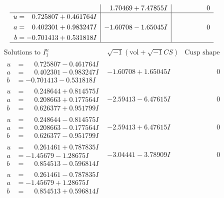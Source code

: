 \documentclass[1p]{elsarticle_modified}
\theoremstyle{definition}
\newcommand{\I}{\sqrt{-1}}
\begin{document}
$$\begin{array}{c|c|c}
 & \phantom{-}1.70469 + 7.47855 I & \phantom{-0.000000 } 0 \\ \hline\begin{aligned}
u &= \phantom{-}0.725807 + 0.461764 I \\
a &= \phantom{-}0.402301 + 0.983247 I \\
b &= -0.701413 + 0.531818 I\end{aligned}
 & -1.60708 - 1.65045 I & \phantom{-0.000000 } 0\\
 \hline 
 \end{array}$$\newpage$$\begin{array}{c|c|c}  
\text{Solutions to }I^u_{1}& \I (\text{vol} + \sqrt{-1}CS) & \text{Cusp shape}\\
 \hline 
\begin{aligned}
u &= \phantom{-}0.725807 - 0.461764 I \\
a &= \phantom{-}0.402301 - 0.983247 I \\
b &= -0.701413 - 0.531818 I\end{aligned}
 & -1.60708 + 1.65045 I & \phantom{-0.000000 } 0 \\ \hline\begin{aligned}
u &= \phantom{-}0.248644 + 0.814575 I \\
a &= \phantom{-}0.208663 + 0.177564 I \\
b &= \phantom{-}0.626377 + 0.951799 I\end{aligned}
 & -2.59413 - 6.47615 I & \phantom{-0.000000 } 0 \\ \hline\begin{aligned}
u &= \phantom{-}0.248644 - 0.814575 I \\
a &= \phantom{-}0.208663 - 0.177564 I \\
b &= \phantom{-}0.626377 - 0.951799 I\end{aligned}
 & -2.59413 + 6.47615 I & \phantom{-0.000000 } 0 \\ \hline\begin{aligned}
u &= \phantom{-}0.261461 + 0.787835 I \\
a &= -1.45679 - 1.28675 I \\
b &= \phantom{-}0.854513 - 0.596814 I\end{aligned}
 & -3.04441 - 3.78909 I & \phantom{-0.000000 } 0 \\ \hline\begin{aligned}
u &= \phantom{-}0.261461 - 0.787835 I \\
a &= -1.45679 + 1.28675 I \\
b &= \phantom{-}0.854513 + 0.596814 I\end{aligned}

\end{array}$$
\end{document}
